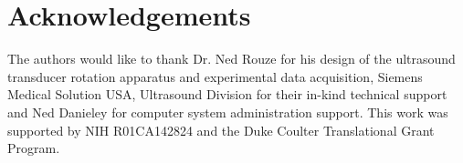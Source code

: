\section*{Acknowledgements} 
The authors would like to thank Dr. Ned Rouze for his design of the ultrasound
transducer rotation apparatus and experimental data acquisition, Siemens
Medical Solution USA, Ultrasound Division for their in-kind technical support
and Ned Danieley for computer system administration support.  This work was
supported by NIH R01CA142824 and the Duke Coulter Translational Grant Program.

